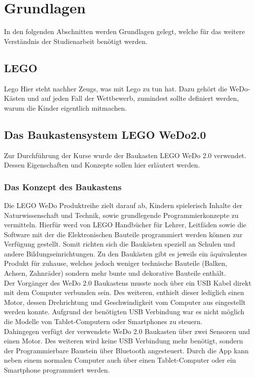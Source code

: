 \chapter{Grundlagen}

In den folgenden Abschnitten werden Grundlagen gelegt, welche für das weitere Verständnis der Studienarbeit benötigt werden.

\section{LEGO}
\gls{Lego}
Hier steht nachher Zeugs, was mit Lego zu tun hat. Dazu gehört die WeDo-Kästen und auf jeden Fall der Wettbewerb, zumindest sollte definiert werden, warum die Kinder eigentlich mitmachen.


\section{Das Baukastensystem LEGO WeDo2.0}
Zur Durchführung der Kurse wurde der Baukasten LEGO WeDo 2.0 verwendet. Dessen Eigenschaften und Konzepte sollen hier erläutert werden.
\subsection{Das Konzept des Baukastens}
Die LEGO WeDo Produktreihe zielt darauf ab, Kindern spielerisch Inhalte der Naturwissenschaft und Technik, sowie grundlegende Programmierkonzepte zu vermitteln. Hierfür werd von LEGO Handbücher für Lehrer, Leitfäden sowie die Software mit der die Elektronischen Bauteile programmiert werden können zur Verfügung gestellt. Somit richten sich die Baukästen speziell an Schulen und andere Bildungseinrichtungen. Zu den Baukästen gibt es jeweils ein äquivalentes Produkt für zuhause, welches jedoch weniger technische Bauteile (Balken, Achsen, Zahnräder) sondern mehr bunte und dekorative Bauteile enthält.\\ 
Der Vorgänger des WeDo 2.0 Baukastens musste noch über ein USB Kabel direkt mit dem Computer verbunden sein. Des weiteren, enthielt dieser lediglich einen Motor, dessen Drehrichtung und Geschwindigkeit vom Computer aus eingestellt werden konnte. Aufgrund der benötigten USB Verbindung war es nicht möglich die Modelle von Tablet-Computern oder Smartphones zu steuern.  \\
Dahingegen verfügt der verwendete WeDo 2.0 Baukasten über zwei Sensoren und einen Motor. Des weiteren wird keine USB Verbindung mehr benötigt, sondern der Programmierbare Baustein über Bluetooth angesteuert. Durch die App kann neben einem normalen Computer auch über einen Tablet-Computer oder ein Smartphone programmiert werden.

